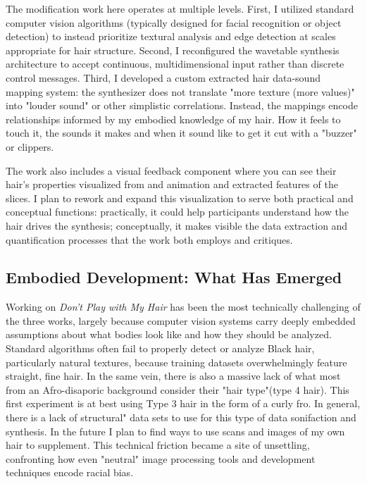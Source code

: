 The modification work here operates at multiple levels. First, I utilized standard computer vision algorithms (typically designed for facial recognition or object detection) to instead prioritize textural analysis and edge detection at scales appropriate for hair structure. Second, I reconfigured the wavetable synthesis architecture to accept continuous, multidimensional input rather than discrete control messages. Third, I developed a custom extracted hair data-sound mapping system: the synthesizer does not translate "more texture (more values)" into "louder sound" or other simplistic correlations. Instead, the mappings encode relationships informed by my embodied knowledge of my hair. How it feels to touch it, the sounds it makes and when it sound like to get it cut with a "buzzer" or clippers.

The work also includes a visual feedback component where you can see their hair's properties visualized from and animation and extracted features of the slices. I plan to rework and expand this visualization to serve both practical and conceptual functions: practically, it  could help participants understand how the hair drives the synthesis; conceptually, it makes visible the data extraction and quantification processes that the work both employs and critiques.

\subsection{Embodied Development: What Has Emerged}

Working on \emph{Don't Play with My Hair} has been the most technically challenging of the three works, largely because computer vision systems carry deeply embedded assumptions about what bodies look like and how they should be analyzed. Standard algorithms often fail to properly detect or analyze Black hair, particularly natural textures, because training datasets overwhelmingly feature straight, fine hair. In the same vein, there is also a massive lack of what most from an Afro-disaporic background consider their "hair type"(type 4 hair). This first experiment is at best using Type 3 hair in the form of a curly fro. In general, there is a lack of structural" data sets to use for this type of data sonifaction and synthesis. In the future I plan to find ways to use scans and images of my own hair to supplement. This technical friction became a site of unsettling, confronting how even "neutral" image processing tools and development techniques encode racial bias.

